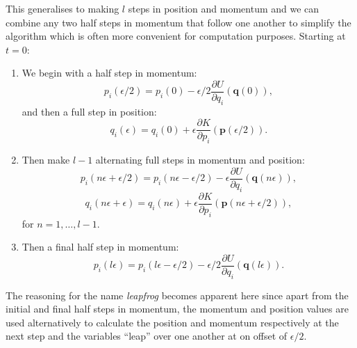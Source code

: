 \documentclass[12pt]{article}
\begin{document}
            This generalises to making $l$ steps in position and momentum and we can combine any two half steps in momentum that follow one another to simplify the algorithm which is often more convenient for computation purposes. Starting at $t=0$:
            \begin{enumerate}
                \item We begin with a half step in momentum:
                \begin{equation}
                    \label{eq:MomentumInitialHalfStep}
                    p_i\left(\epsilon/2\right) = p_i\left(0\right) - \epsilon/2\frac{\partial U}{\partial q_i}\left(\bm{q}\left(0\right)\right),
                \end{equation}
                and then a full step in position:
                \begin{equation}
                    \label{eq:PositionInitialStep}
                    q_i\left(\epsilon\right) = q_i\left(0\right) + \epsilon\frac{\partial K}{\partial p_i}\left(\bm{p}\left(\epsilon/2\right)\right).
                \end{equation}
                \item Then make $l-1$ alternating full steps in momentum and position:
                \begin{equation}
                    \label{eq:MomentumFullStep}
                    p_i\left(n\epsilon+\epsilon/2\right) = p_i\left(n\epsilon-\epsilon/2\right) - \epsilon\frac{\partial U}{\partial q_i}\left(\bm{q}\left(n\epsilon\right)\right),
                \end{equation}
                \begin{equation}
                    \label{eq:PositionFullStep}
                    q_i\left(n\epsilon+\epsilon\right) = q_i\left(n\epsilon\right) + \epsilon\frac{\partial K}{\partial p_i}\left(\bm{p}\left(n\epsilon+\epsilon/2\right)\right),
                \end{equation}
                for $n = 1, \dots , l-1$.
                \item Then a final half step in momentum:
                \begin{equation}
                    \label{eq:Momnetum}
                    p_i\left(l\epsilon\right) = p_i\left(l\epsilon-\epsilon/2\right) - \epsilon/2\frac{\partial U}{\partial q_i}\left(\bm{q}\left(l\epsilon\right)\right).
                \end{equation}
            \end{enumerate}
            The reasoning for the name \textit{leapfrog} becomes apparent here since apart from the initial and final half steps in momentum, the momentum and position values are used alternatively to calculate the position and momentum respectively at the next step and the variables ``leap'' over one another at on offset of $\epsilon/2$. 
\end{document}
